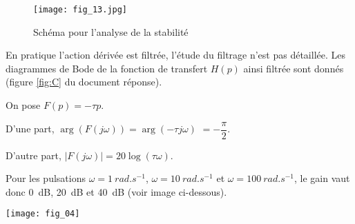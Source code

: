 \ifprof
\else

\begin{figure}[H]
\centering
\texttt{[image: fig\_13.jpg]}
\caption{\label{fig:13} Schéma pour l'analyse de la stabilité}
\end{figure}

En pratique l'action dérivée est filtrée, l'étude du filtrage n'est pas détaillée. Les diagrammes de Bode de la fonction de transfert $H(p)$ ainsi filtrée sont donnés (figure \ref{fig:C} du document réponse). 
\fi

\ifprof
\begin{corrige}
On pose $F(p) = -\tau p$. 

D'une part, 
$\arg\left(F\left(j\omega\right)\right) =\arg\left(-\tau j\omega \right)$ $=-\dfrac{\pi}{2}$.

D'autre part, 
$\left|F\left(j\omega\right)\right| =20\log\left( \tau\omega\right)$.

Pour les pulsations 
$\omega=\SI{1}{rad.s^{-1}}$, $\omega=\SI{10}{rad.s^{-1}}$ et $\omega=\SI{100}{rad.s^{-1}}$, le gain vaut donc \SI{0}{dB}, \SI{20}{dB} et \SI{40}{dB} (voir image ci-dessous).

\begin{center}
\texttt{[image: fig\_04]}
\end{center}

\end{corrige}
\else
\fi

